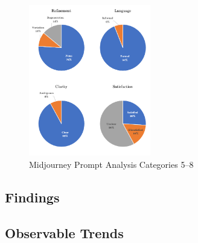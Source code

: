\begin{figure}
    \centering
    \includegraphics[width=0.475\textwidth]{images/charts4}
    \caption{Midjourney Prompt Analysis Categories 5--8}
    \label{fig:midjourney-categories-2}
\end{figure}

\subsection{Findings}
\label{subsec:findings}

\subsection{Observable Trends}
\label{subsec:observable-trends}

